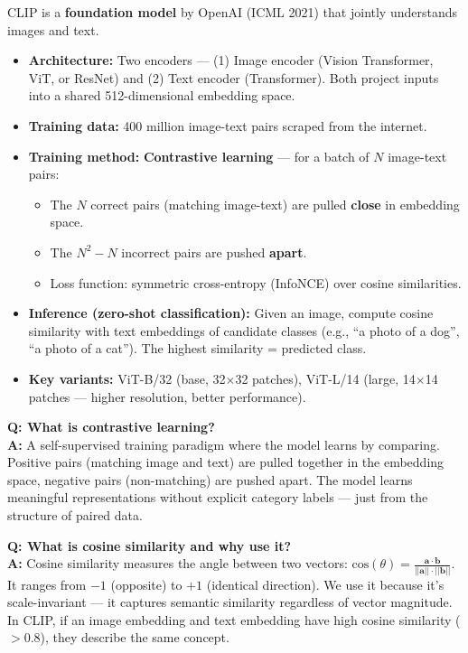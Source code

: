 \documentclass[12pt, a4paper]{article}
\begin{document}
CLIP is a \textbf{foundation model} by OpenAI (ICML 2021) that jointly understands images and text.

\begin{itemize}[leftmargin=*]
    \item \textbf{Architecture:} Two encoders --- (1) Image encoder (Vision Transformer, ViT, or ResNet) and (2) Text encoder (Transformer). Both project inputs into a shared 512-dimensional embedding space.
    \item \textbf{Training data:} 400 million image-text pairs scraped from the internet.
    \item \textbf{Training method:} \textbf{Contrastive learning} --- for a batch of $N$ image-text pairs:
    \begin{itemize}
        \item The $N$ correct pairs (matching image-text) are pulled \textbf{close} in embedding space.
        \item The $N^2 - N$ incorrect pairs are pushed \textbf{apart}.
        \item Loss function: symmetric cross-entropy (InfoNCE) over cosine similarities.
    \end{itemize}
    \item \textbf{Inference (zero-shot classification):} Given an image, compute cosine similarity with text embeddings of candidate classes (e.g., ``a photo of a dog'', ``a photo of a cat''). The highest similarity = predicted class.
    \item \textbf{Key variants:} ViT-B/32 (base, 32$\times$32 patches), ViT-L/14 (large, 14$\times$14 patches --- higher resolution, better performance).
\end{itemize}

\begin{vivaqa}
\textbf{Q: What is contrastive learning?}\\[4pt]
\textbf{A:} A self-supervised training paradigm where the model learns by comparing. Positive pairs (matching image and text) are pulled together in the embedding space, negative pairs (non-matching) are pushed apart. The model learns meaningful representations without explicit category labels --- just from the structure of paired data.
\end{vivaqa}

\begin{vivaqa}
\textbf{Q: What is cosine similarity and why use it?}\\[4pt]
\textbf{A:} Cosine similarity measures the angle between two vectors: $\text{cos}(\theta) = \frac{\mathbf{a} \cdot \mathbf{b}}{||\mathbf{a}|| \cdot ||\mathbf{b}||}$. It ranges from $-1$ (opposite) to $+1$ (identical direction). We use it because it's scale-invariant --- it captures semantic similarity regardless of vector magnitude. In CLIP, if an image embedding and text embedding have high cosine similarity ($>$0.8), they describe the same concept.
\end{vivaqa}
\end{document}
